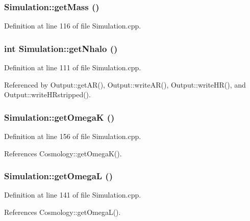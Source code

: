 \subsubsection[{getMass}]{ Simulation::getMass ()}\label{classSimulation_a6e3b4dd7c028d3061ae2e737623d0f61}


Definition at line 116 of file Simulation.cpp.

\subsubsection[{getNhalo}]{\setlength{\rightskip}{0pt plus 5cm}int Simulation::getNhalo ()}\label{classSimulation_a011d6d7f9e6cdee706653fc958928a5f}


Definition at line 111 of file Simulation.cpp.



Referenced by Output::getAR(), Output::writeAR(), Output::writeHR(), and Output::writeHRstripped().

\subsubsection[{getOmegaK}]{ Simulation::getOmegaK ()}\label{classSimulation_a5e2c533b06ab140279e74c3a2e9065a9}


Definition at line 156 of file Simulation.cpp.



References Cosmology::getOmegaK().

\subsubsection[{getOmegaL}]{ Simulation::getOmegaL ()}\label{classSimulation_ae4579378ff6638e8edee1900a1105335}


Definition at line 141 of file Simulation.cpp.



References Cosmology::getOmegaL().

